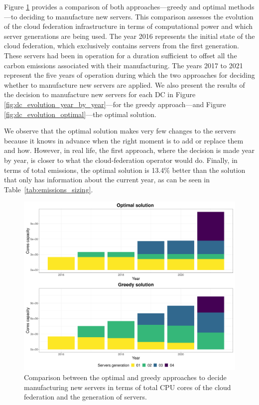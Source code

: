 Figure \ref{fig:dc_evolution_comparison} provides a comparison of both approaches---greedy and optimal methods---to deciding to manufacture new servers.   This comparison assesses the evolution of the cloud federation infrastructure in terms of computational power and which server generations are being used. The year 2016 represents the initial state of the cloud federation, which exclusively contains servers from the first generation. These servers had been in operation for a duration sufficient to offset all the carbon emissions associated with their manufacturing. The years 2017 to 2021 represent the five years of operation during which the two approaches for deciding whether to manufacture new servers are applied. We also present the results of the decision to manufacture new servers for each DC in Figure \ref{fig:dc_evolution_year_by_year}---for the greedy approach---and Figure \ref{fig:dc_evolution_optimal}---the optimal solution.

We observe that the optimal solution makes very few changes to the servers because it knows in advance when the right moment is to add or replace them and how. However, in real life, the first approach, where the decision is made year by year, is closer to what the cloud-federation operator would do. Finally, in terms of total  emissions, the optimal solution is 13.4\% better than the solution that only has information about the current year, as can be seen in Table~\ref{tab:emissions_sizing}.

\begin{figure}[ht]
\centering 
  \includegraphics[width=\linewidth]{images/cloud_federation_evolution_lifetime.png}
  \caption{Comparison between the optimal and greedy approaches to decide manufacturing new servers in terms of total CPU cores of the cloud federation and the generation of servers.}
  \label{fig:dc_evolution_comparison}
\end{figure}


